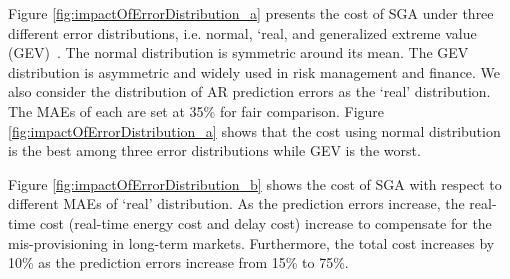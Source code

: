 Figure \ref{fig:impactOfErrorDistribution_a} presents the cost of SGA under three different error distributions, i.e. normal, `real, and generalized extreme value (GEV)~\cite{corcoran2002modelling}. The normal distribution is symmetric around its mean. The GEV distribution is asymmetric and widely used in risk management and finance. We also consider the distribution of AR prediction errors as the `real' distribution. The MAEs of each are set at 35\% for fair comparison. Figure \ref{fig:impactOfErrorDistribution_a} shows that the cost using normal distribution is the best among three error distributions while GEV is the worst. %

Figure \ref{fig:impactOfErrorDistribution_b} shows the cost of SGA with respect to different MAEs of `real' distribution.  As the prediction errors increase, the real-time cost (real-time energy cost and delay cost) increase to compensate for the mis-provisioning in long-term markets. Furthermore, the total cost increases by 10\% as the prediction errors increase from 15\% to 75\%. 

